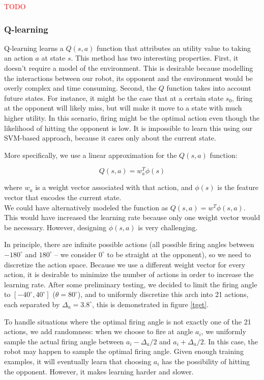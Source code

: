 \documentclass{article}
\newcommand{\xxx}[1]{\textcolor{red}{#1}}
\theoremstyle{plain}
\theoremstyle{definition}
\theoremstyle{remark}
\begin{document}
\xxx{TODO}

\subsubsection*{Q-learning}
Q-learning \cite{watkins92a} learns a $Q(s, a)$ function that attributes an utility value to taking an action $a$ at state $s$. This method
has two interesting properties. First, it doesn't require a model of the environment. This is desirable because modelling the
interactions between our robot, its opponent and the environment would be overly complex and time consuming. Second, the $Q$ function
takes into account future states. For instance, it might be the case that
at a certain state $s_0$, firing at the opponent will likely miss, but will make it move to a state with much higher utility. In this scenario,
firing might be the optimal action even though the likelihood of hitting the opponent is low. It is impossible to learn this using our
SVM-based approach, because it cares only about the current state.

More specifically, we use a linear approximation for the $Q(s, a)$ function:

$$Q(s, a) = w_a^T\phi(s)$$

where $w_a$ is a weight vector associated with that action, and $\phi(s)$ is the feature vector that encodes the current state.\\

We could have alternatively modeled the function as $Q(s,a) = w^T\phi(s, a)$. This would have increased the learning rate because only
one weight vector would be necessary. However, designing $\phi(s, a)$ is very challenging.

In principle, there are infinite possible actions (all possible firing angles between $-180^{\circ} $ and $180^{\circ} $ -- we consider $0^{\circ}$ to be straight at the opponent),
so we need to discretize the
action space. Because we use a different weight vector for every action, it is desirable to minimize the number of actions in order
to increase the learning rate. After some preliminary testing, we decided to limit the firing angle to $[-40^{\circ}, 40^{\circ}]$ ($\theta = 80^{\circ}$), and to uniformly discretize this arch into
21 actions, each separated by $\Delta_a = 3.8^{\circ}$, this is demonstrated in figure \ref{tget}.

To handle situations where the optimal firing angle is not exactly one of the 21 actions, we add randomness: when we choose to fire at angle $a_i$, we uniformly sample the actual
firing angle between $a_i - \Delta_a/2$ and $a_i + \Delta_a/2$. In this case, the robot may happen to sample the optimal firing angle. Given enough training examples, it will
eventually learn that choosing $a_i$ has the possibility of hitting the opponent. However, it makes learning harder and slower.
\end{document}
